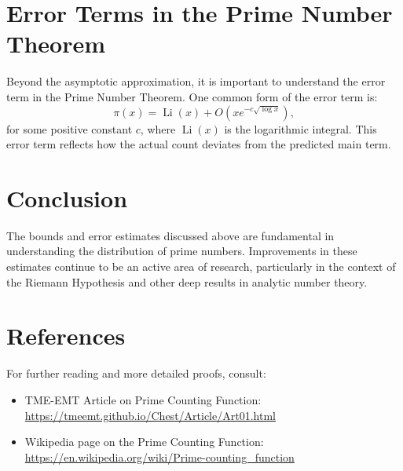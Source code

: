 \section{Error Terms in the Prime Number Theorem}
Beyond the asymptotic approximation, it is important to understand the error term in the Prime Number Theorem. One common form of the error term is:
\[
\pi(x) = \operatorname{Li}(x) + O\left(x e^{-c\sqrt{\log x}}\right),
\]
for some positive constant \(c\), where $\operatorname{Li}(x)$ is the logarithmic integral. This error term reflects how the actual count deviates from the predicted main term.

\section{Conclusion}
The bounds and error estimates discussed above are fundamental in understanding the distribution of prime numbers. Improvements in these estimates continue to be an active area of research, particularly in the context of the Riemann Hypothesis and other deep results in analytic number theory.

\section{References}
For further reading and more detailed proofs, consult:
\begin{itemize}
    \item TME-EMT Article on Prime Counting Function: \url{https://tmeemt.github.io/Chest/Article/Art01.html}
    \item Wikipedia page on the Prime Counting Function: \url{https://en.wikipedia.org/wiki/Prime-counting_function}
\end{itemize}
